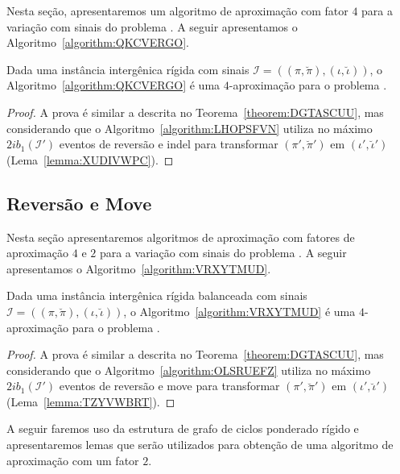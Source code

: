 Nesta seção, apresentaremos um algoritmo de aproximação com fator $4$ para a variação com sinais do problema \SbIRI{}. A seguir apresentamos o Algoritmo~\ref{algorithm:QKCVERGO}.



\begin{theorem}\label{theorem:CLXFCZMR}
Dada uma instância intergênica rígida com sinais $\mathcal{I}=((\pi,\breve\pi),(\iota,\breve\iota))$, o Algoritmo~\ref{algorithm:QKCVERGO} é uma $4$-aproximação para o problema \SbIRI{}.
\end{theorem}
\begin{proof}
A prova é similar a descrita no Teorema~\ref{theorem:DGTASCUU}, mas considerando que o Algoritmo~\ref{algorithm:LHOPSFVN} utiliza no máximo $2ib_1(\mathcal{I'})$ eventos de reversão e indel para transformar $(\pi',\breve\pi')$ em $(\iota',\breve\iota')$ (Lema~\ref{lemma:XUDIVWPC}).
\end{proof}

\subsection{Reversão e Move}

Nesta seção apresentaremos algoritmos de aproximação com fatores de aproximação $4$ e $2$ para a variação com sinais do problema \SbIRM{}. A seguir apresentamos o Algoritmo~\ref{algorithm:VRXYTMUD}.



\begin{theorem}\label{theorem:KJSCUFTB}
Dada uma instância intergênica rígida balanceada com sinais $\mathcal{I}=((\pi,\breve\pi),(\iota,\breve\iota))$, o Algoritmo~\ref{algorithm:VRXYTMUD} é uma $4$-aproximação para o problema \SbIRM{}.
\end{theorem}
\begin{proof}
A prova é similar a descrita no Teorema~\ref{theorem:DGTASCUU}, mas considerando que o Algoritmo~\ref{algorithm:OLSRUEFZ} utiliza no máximo $2ib_1(\mathcal{I'})$ eventos de reversão e move para transformar $(\pi',\breve\pi')$ em $(\iota',\breve\iota')$ (Lema~\ref{lemma:TZYVWBRT}).
\end{proof}

A seguir faremos uso da estrutura de grafo de ciclos ponderado rígido e apresentaremos lemas que serão utilizados para obtenção de uma algoritmo de aproximação com um fator $2$.

